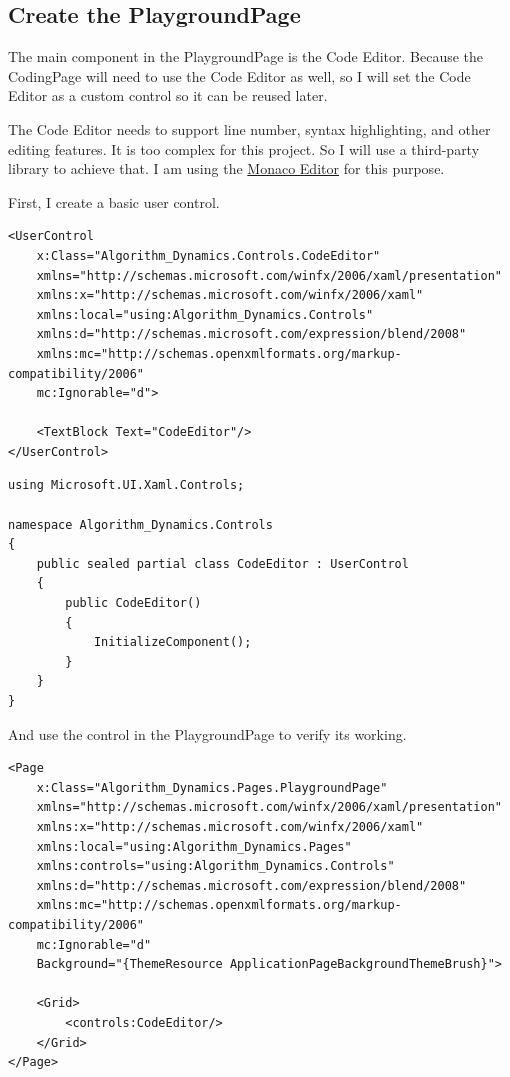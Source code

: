 \documentclass[a4paper]{report}
\begin{document}
\subsection{Create the PlaygroundPage}

The main component in the PlaygroundPage is the Code Editor. Because the CodingPage will need to use the Code Editor as well, so I will set the Code Editor as a custom control so it can be reused later.

The Code Editor needs to support line number, syntax highlighting, and other editing features. It is too complex for this project. So I will use a third-party library to achieve that. I am using the \href{https://microsoft.github.io/monaco-editor/}{Monaco Editor} for this purpose.

First, I create a basic user control.

\begin{verbatim}
<UserControl
    x:Class="Algorithm_Dynamics.Controls.CodeEditor"
    xmlns="http://schemas.microsoft.com/winfx/2006/xaml/presentation"
    xmlns:x="http://schemas.microsoft.com/winfx/2006/xaml"
    xmlns:local="using:Algorithm_Dynamics.Controls"
    xmlns:d="http://schemas.microsoft.com/expression/blend/2008"
    xmlns:mc="http://schemas.openxmlformats.org/markup-compatibility/2006"
    mc:Ignorable="d">

    <TextBlock Text="CodeEditor"/>
</UserControl>
\end{verbatim}

\begin{verbatim}
using Microsoft.UI.Xaml.Controls;

namespace Algorithm_Dynamics.Controls
{
    public sealed partial class CodeEditor : UserControl
    {
        public CodeEditor()
        {
            InitializeComponent();
        }
    }
}
\end{verbatim}

And use the control in the PlaygroundPage to verify its working.

\begin{verbatim}
<Page
    x:Class="Algorithm_Dynamics.Pages.PlaygroundPage"
    xmlns="http://schemas.microsoft.com/winfx/2006/xaml/presentation"
    xmlns:x="http://schemas.microsoft.com/winfx/2006/xaml"
    xmlns:local="using:Algorithm_Dynamics.Pages"
    xmlns:controls="using:Algorithm_Dynamics.Controls"
    xmlns:d="http://schemas.microsoft.com/expression/blend/2008"
    xmlns:mc="http://schemas.openxmlformats.org/markup-compatibility/2006"
    mc:Ignorable="d"
    Background="{ThemeResource ApplicationPageBackgroundThemeBrush}">

    <Grid>
        <controls:CodeEditor/>
    </Grid>
</Page>
\end{verbatim}
\end{document}
